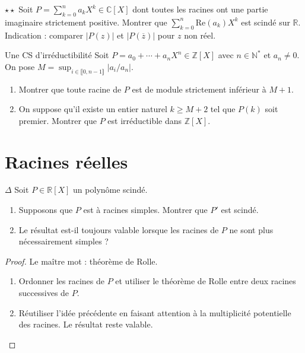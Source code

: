 \documentclass[french,a4paper]{article}
\newcommand{\N}{\mathbb{N}}
\newcommand{\Z}{\mathbb{Z}}
\newcommand{\R}{\mathbb{R}}
\newcommand{\C}{\mathbb{C}}
\newcommand{\st}{^*}
\theoremstyle{plain}
\theoremstyle{definition}
\theoremstyle{remark}
\begin{document}
\begin{ex}[Moulin.25]{$\star\star$}
	Soit $P=\displaystyle\sum_{k=0}^{n}a_kX^k\in\C[X]$ dont toutes les racines ont une partie imaginaire strictement positive. Montrer que $\displaystyle\sum_{k=0}^{n}\text{Re}(a_k)X^k$ est scindé sur $\R$. Indication : comparer $\lvert P(z)\rvert$ et $\lvert P(\overline{z})\rvert$ pour $z$ non réel.
\end{ex}

\begin{ex}[Moulin.26]{Une CS d'irréductibilité}
	Soit $P=a_0+\cdots+a_nX^n\in\Z[X]$ avec $n\in\N\st$ et $a_n\ne 0$. On pose $M=\displaystyle\sup_{i\in\llbracket0,n-1\rrbracket}\lvert a_i/a_{n}\rvert$.
	\begin{enumerate}
		\item Montrer que toute racine de $P$ est de module strictement inférieur à $M+1$.
		\item On suppose qu'il existe un entier naturel $k\geqslant M+2$ tel que $P(k)$ soit premier. Montrer que $P$ est irréductible dans $\Z[X]$.
	\end{enumerate}
\end{ex}

\section{Racines réelles}

\begin{ex}[Moulin.27]{$\Delta$}
	Soit $P \in \R[X]$ un polynôme scindé.
	\begin{enumerate}
		\item Supposons que $P$ est à racines simples. Montrer que $P'$ est scindé.
		\item Le résultat est-il toujours valable lorsque les racines de $P$ ne sont plus nécessairement simples ?
	\end{enumerate}
\end{ex}
\begin{proof}
	Le maître mot : théorème de Rolle. 
	\begin{enumerate}
		\item Ordonner les racines de $P$ et utiliser le théorème de Rolle entre deux racines successives de $P$.
		\item Réutiliser l'idée précédente en faisant attention à la multiplicité potentielle des racines. Le résultat reste valable.
	\end{enumerate}
\end{proof}
\end{document}
